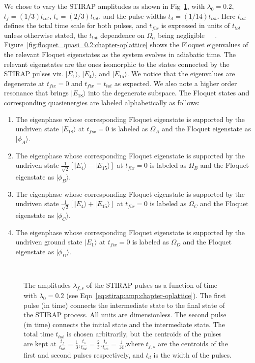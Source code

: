 We chose to vary the STIRAP amplitudes as shown in Fig~\ref{fig:stirap_amps:chapter-oplattice}, with $\lambda_0=0.2$, $t_f=(1/3) t_{tot}$, $t_s=(2/3)t_{tot}$, and the pulse widths $t_d=(1/14)t_{tot}$. Here $t_{tot}$ defines the total time scale for both pulses, and $t_{fix}$ is expressed in units of $t_{tot}$ unless otherwise stated, the $t_{tot}$ dependence on $\Omega_\alpha$ being negligible~\cite{na-reichl:pbox}~\cite{na-reichl:mol-rot}~\cite{na-reichl:isomer}. Figure~\ref{fig:floquet_quasi_0.2:chapter-oplattice} shows the Floquet eigenvalues of the relevant Floquet eigenstates as the system evolves in adiabatic time. The relevant eigenstates are the ones isomorphic to the states connected by the STIRAP pulses viz. $|E_1\rangle$, $|E_4\rangle$, and $|E_{15}\rangle$. We notice that the eigenvalues are degenerate at $t_{fix}=0$ and $t_{fix}=t_{tot}$ as expected. We also note a higher order resonance that brings $|E_{18}\rangle$ into the degenerate subspace. The Floquet states and corresponding quasienergies are labeled alphabetically as follows:
\begin{enumerate}
 \item
The eigenphase whose corresponding Floquet eigenstate is supported by the undriven  state $|E_{18}{\rangle}$  at $t_{fix}=0$ is labeled as $\Omega_A$ and the Floquet eigenstate as $|\phi_A\rangle$.
\item
The eigenphase whose corresponding Floquet eigenstate is supported by the undriven state $\frac{1}{\sqrt{2}}\left[|E_4\rangle - |E_{15}\rangle \right]$ at $t_{fix}=0$ is labeled as $\Omega_B$ and the Floquet eigenstate as $|\phi_B\rangle$.
\item
The eigenphase whose corresponding Floquet eigenstate is supported by the undriven state $\frac{1}{\sqrt{2}}\left[|E_4\rangle + |E_{15}\rangle \right]$ at $t_{fix}=0$  is labeled as $\Omega_C$ and the Floquet eigenstate as $|\phi_C\rangle$.
\item 
The eigenphase whose corresponding Floquet eigenstate is supported by the undriven ground state $|E_1{\rangle}$  at $t_{fix}=0$ is labeled as $\Omega_D$ and the Floquet eigenstate as $|\phi_D\rangle$.
\end{enumerate}
\begin{figure} 
\ 
\caption{The amplitudes $\lambda_{f,s}$ of the STIRAP pulses as a function of time with $\lambda_0=0.2$ (see Eqn~\ref{eq:stirap:amp:chapter-oplattice}). The first pulse (in time)  connects the intermediate state to the final state of the STIRAP process. All units are dimensionless. The second pulse (in time)  connects the initial state and the intermediate state. The total time $t_{tot}$ is chosen arbitrarily, but the centroids of the pulses are kept at $\frac{t_f}{t_{tot}}=\frac{1}{3}$,$\frac{t_s}{t_{tot}}=\frac{2}{3}$,$\frac{t_d}{t_{tot}}=\frac{1}{14}$,where $t_{f,s}$ are the centroids of the first and second pulses respectively, and $t_d$ is the width of the pulses.}
\label{fig:stirap_amps:chapter-oplattice}
\end{figure}

